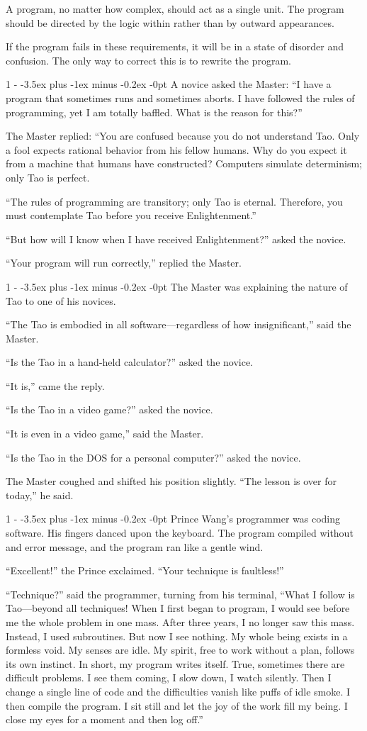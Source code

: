 \documentclass[12pt,letterpaper,titlepage]{article}
\makeatletter
\newlength{\intomargin}\setlength{\intomargin}{25pt}
\renewcommand{\subsection}{%
\@startsection{subsection}%
{1}%
{-\intomargin}%
{-3.5ex plus -1ex minus -0.2ex}%
{-0pt}%
{\normalfont\normalsize\bfseries}%
}
\newcommand{\sect}{\subsection{}}
\makeatother
\begin{document}
A program, no matter how complex, should act as a single unit. The
program should be directed by the logic within rather than by outward
appearances.

If the program fails in these requirements, it will be in a state of
disorder and confusion. The only way to correct this is to rewrite the
program.

\sect
A novice asked the Master: ``I have a program that sometimes runs and
sometimes aborts. I have followed the rules of programming, yet I am
totally baffled. What is the reason for this?''

The Master replied: ``You are confused because you do not understand
Tao. Only a fool expects rational behavior from his fellow humans. Why
do you expect it from a machine that humans have constructed?
Computers simulate determinism; only Tao is perfect.

``The rules of programming are transitory; only Tao is
eternal. Therefore, you must contemplate Tao before you receive
Enlightenment.''

``But how will I know when I have received Enlightenment?'' asked the
novice.

``Your program will run correctly,'' replied the Master.

\sect
The Master was explaining the nature of Tao to one of his novices.

``The Tao is embodied in all software---regardless of how
insignificant,'' said the Master.

``Is the Tao in a hand-held calculator?'' asked the novice.

``It is,'' came the reply.

``Is the Tao in a video game?'' asked the novice.

``It is even in a video game,'' said the Master.

``Is the Tao in the {\small DOS} for a personal computer?'' asked the novice.

The Master coughed and shifted his position slightly. ``The lesson is
over for today,'' he said.

\sect
Prince Wang's programmer was coding software. His fingers danced upon
the keyboard. The program compiled without and error message, and the
program ran like a gentle wind.

``Excellent!'' the Prince exclaimed. ``Your technique is faultless!''

``Technique?'' said the programmer, turning from his terminal, ``What
I follow is Tao---beyond all techniques! When I first began to
program, I would see before me the whole problem in one mass. After
three years, I no longer saw this mass. Instead, I used
subroutines. But now I see nothing. My whole being exists in a
formless void. My senses are idle. My spirit, free to work without a
plan, follows its own instinct. In short, my program writes
itself. True, sometimes there are difficult problems. I see them
coming, I slow down, I watch silently. Then I change a single line of
code and the difficulties vanish like puffs of idle smoke. I then
compile the program. I sit still and let the joy of the work fill my
being. I close my eyes for a moment and then log off.''
\end{document}
